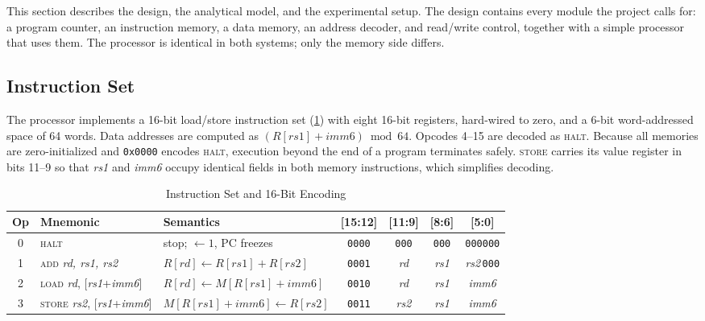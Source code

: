 \documentclass[conference]{IEEEtran}
\newcommand{\sig}[1]{\texttt{\detokenize{#1}}}
\begin{document}
This section describes the design, the analytical model, and the experimental setup. The design
contains every module the project calls for: a program counter, an instruction memory, a data
memory, an address decoder, and read/write control, together with a simple processor that uses
them. The processor is identical in both systems; only the memory side differs.

\subsection{Instruction Set}
The processor implements a 16-bit load/store instruction set (\cref{tab:isa}) with eight 16-bit
registers, \sig{R0} hard-wired to zero, and a 6-bit word-addressed space of 64 words. Data addresses
are computed as $(R[\mathit{rs1}] + \mathit{imm6}) \bmod 64$. Opcodes 4--15 are decoded as
\textsc{halt}. Because all memories are zero-initialized and \texttt{0x0000} encodes \textsc{halt},
execution beyond the end of a program terminates safely. \textsc{store} carries its value register
in bits 11--9 so that \emph{rs1} and \emph{imm6} occupy identical fields in both memory instructions,
which simplifies decoding.

\begin{table}[t]
\centering
\caption{Instruction Set and 16-Bit Encoding}
\label{tab:isa}
\footnotesize
\begin{tabular}{@{}c l l c c c c@{}}
\toprule
Op & Mnemonic & Semantics & [15:12] & [11:9] & [8:6] & [5:0] \\
\midrule
0 & \textsc{halt} & stop; \sig{halted} $\leftarrow 1$, PC freezes & \texttt{0000} & \texttt{000} & \texttt{000} & \texttt{000000} \\
1 & \textsc{add} \emph{rd, rs1, rs2} & $R[rd] \leftarrow R[rs1] + R[rs2]$ & \texttt{0001} & \emph{rd} & \emph{rs1} & \emph{rs2}\,\texttt{000} \\
2 & \textsc{load} \emph{rd}, [\emph{rs1}+\emph{imm6}] & $R[rd] \leftarrow M[R[rs1]+imm6]$ & \texttt{0010} & \emph{rd} & \emph{rs1} & \emph{imm6} \\
3 & \textsc{store} \emph{rs2}, [\emph{rs1}+\emph{imm6}] & $M[R[rs1]+imm6] \leftarrow R[rs2]$ & \texttt{0011} & \emph{rs2} & \emph{rs1} & \emph{imm6} \\
\bottomrule
\end{tabular}
\end{table}
\end{document}
